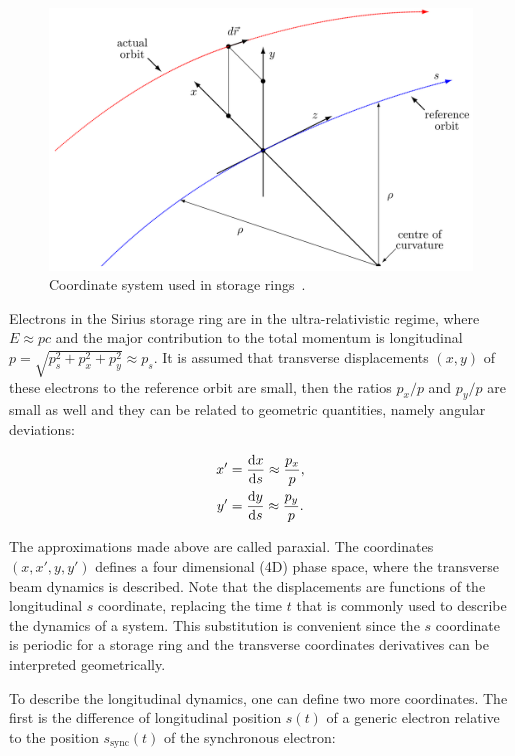 \begin{figure}
    \centering
    \includegraphics[scale=0.25]{figures/reference_system.png}
    \caption{Coordinate system used in storage rings~\cite{madx}.}
    \label{syst}
\end{figure}

Electrons in the Sirius storage ring are in the ultra-relativistic regime, where $E \approx pc$ and the major contribution to the total momentum is longitudinal $p = \sqrt{p_s^2 + p_x^2 + p_y^2} \approx p_s$. It is assumed that transverse displacements $(x, y)$ of these electrons to the reference orbit are small, then the ratios $p_x/p$ and $p_y/p$ are small as well and they can be related to geometric quantities, namely angular deviations:

\begin{align*}
    x' &= \frac{\mathrm{d} x}{\mathrm{d} s} \approx \frac{p_x}{p}, \\
    y' &= \frac{\mathrm{d} y}{\mathrm{d} s} \approx \frac{p_y}{p}.
\end{align*}

The approximations made above are called paraxial. The coordinates $(x, x', y, y')$ defines a four dimensional (4D) phase space, where the transverse beam dynamics is described. Note that the displacements are functions of the longitudinal $s$ coordinate, replacing the time $t$ that is commonly used to describe the dynamics of a system. This substitution is convenient since the $s$ coordinate is periodic for a storage ring and the transverse coordinates derivatives can be interpreted geometrically.

To describe the longitudinal dynamics, one can define two more coordinates. The first is the difference of longitudinal position $s(t)$ of a generic electron relative to the position $s_{\mathrm{sync}}(t)$ of the synchronous electron:

